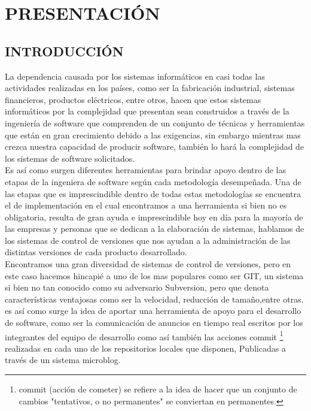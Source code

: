 

%
\chapter{PRESENTACIÓN}
\section{INTRODUCCIÓN}
La dependencia causada por los sistemas informáticos en casi todas las actividades realizadas en los países, como ser la fabricación industrial, sistemas financieros, productos eléctricos, entre otros,
hacen que estos sistemas informáticos por la complejidad que presentan sean construidos a través de la ingeniería de software que comprenden de un conjunto de técnicas y herramientas que están en gran crecimiento debido a las exigencias, sin embargo mientras mas crezca nuestra capacidad de producir software, también lo hará la complejidad de los sistemas de software solicitados.\\

Es así como surgen diferentes herramientas para brindar apoyo dentro de las etapas de la ingeniera de software según cada metodología desempeñada. Una de las etapas que es imprescindible dentro de todas estas metodologías se encuentra el de implementación en el cual encontramos a una herramienta si bien no es obligatoria, resulta de gran ayuda e imprescindible hoy en día para la mayoría de las empresas y personas que se dedican a la elaboración de sistemas, hablamos de los sistemas de control de versiones que nos ayudan a la administración de las distintas versiones de cada producto desarrollado.\\

Encontramos una gran diversidad de sistemas de control de versiones, pero en este caso hacemos hincapié a uno de los mas populares como ser GIT, un sistema si bien no tan conocido como su adversario Subversion, pero que denota características ventajosas como ser la velocidad, reducción de tamaño,entre otras. es así como surge la idea de aportar una herramienta de apoyo para el desarrollo de software, como ser la comunicación de anuncios en tiempo real escritos por los integrantes del equipo de desarrollo como así también las acciones commit \footnote{commit (acción de cometer) se refiere a la idea de hacer que un conjunto de cambios "tentativos, o no permanentes" se conviertan en permanentes.} realizadas en cada uno de los repositorios locales que disponen, Publicadas a través de un sistema microblog.\\

